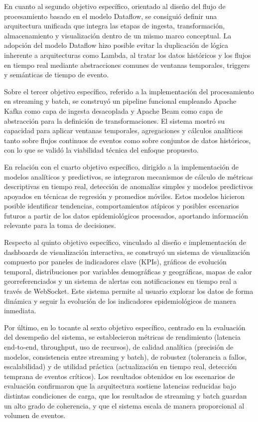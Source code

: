 \documentclass[12pt,a4paper]{article}
\begin{document}
En cuanto al segundo objetivo específico, orientado al diseño del flujo de procesamiento basado en el modelo Dataflow, se consiguió definir una arquitectura unificada que integra las etapas de ingesta, transformación, almacenamiento y visualización dentro de un mismo marco conceptual. La adopción del modelo Dataflow hizo posible evitar la duplicación de lógica inherente a arquitecturas como Lambda, al tratar los datos históricos y los flujos en tiempo real mediante abstracciones comunes de ventanas temporales, triggers y semánticas de tiempo de evento.

Sobre el tercer objetivo específico, referido a la implementación del procesamiento en streaming y batch, se construyó un pipeline funcional empleando Apache Kafka como capa de ingesta desacoplada y Apache Beam como capa de abstracción para la definición de transformaciones. El sistema mostró su capacidad para aplicar ventanas temporales, agregaciones y cálculos analíticos tanto sobre flujos continuos de eventos como sobre conjuntos de datos históricos, con lo que se validó la viabilidad técnica del enfoque propuesto.

En relación con el cuarto objetivo específico, dirigido a la implementación de modelos analíticos y predictivos, se integraron mecanismos de cálculo de métricas descriptivas en tiempo real, detección de anomalías simples y modelos predictivos apoyados en técnicas de regresión y promedios móviles. Estos modelos hicieron posible identificar tendencias, comportamientos atípicos y posibles escenarios futuros a partir de los datos epidemiológicos procesados, aportando información relevante para la toma de decisiones.

Respecto al quinto objetivo específico, vinculado al diseño e implementación de dashboards de visualización interactiva, se construyó un sistema de visualización compuesto por paneles de indicadores clave (KPIs), gráficos de evolución temporal, distribuciones por variables demográficas y geográficas, mapas de calor georreferenciados y un sistema de alertas con notificaciones en tiempo real a través de WebSocket. Este sistema permite al usuario explorar los datos de forma dinámica y seguir la evolución de los indicadores epidemiológicos de manera inmediata.

Por último, en lo tocante al sexto objetivo específico, centrado en la evaluación del desempeño del sistema, se establecieron métricas de rendimiento (latencia end-to-end, throughput, uso de recursos), de calidad analítica (precisión de modelos, consistencia entre streaming y batch), de robustez (tolerancia a fallos, escalabilidad) y de utilidad práctica (actualización en tiempo real, detección temprana de eventos críticos). Los resultados obtenidos en los escenarios de evaluación confirmaron que la arquitectura sostiene latencias reducidas bajo distintas condiciones de carga, que los resultados de streaming y batch guardan un alto grado de coherencia, y que el sistema escala de manera proporcional al volumen de eventos.
\end{document}
